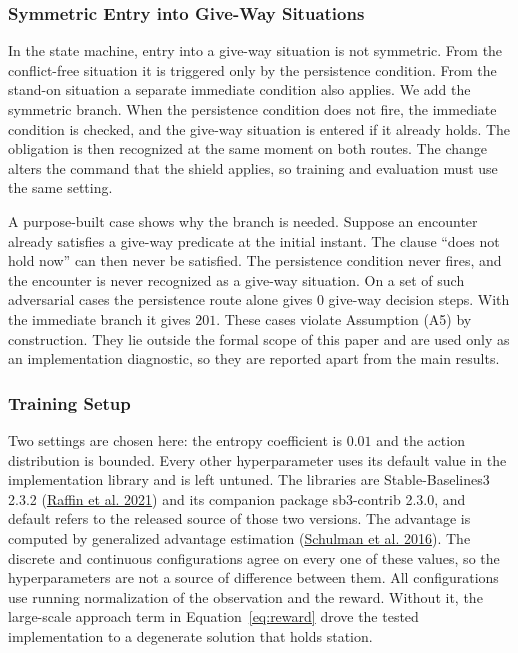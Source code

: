 \documentclass[10pt,letterpaper]{article}
\newcommand{\citl}[2]{(\hyperlink{ref:#1}{#2})}
\begin{document}
\subsubsection{Symmetric Entry into Give-Way Situations}
\label{sec:sym}

In the state machine, entry into a give-way situation is not symmetric. From the
conflict-free situation it is triggered only by the persistence condition. From the
stand-on situation a separate immediate condition also applies. We add the symmetric
branch. When the persistence condition
does not fire, the immediate condition is checked, and the give-way situation is entered if
it already holds. The obligation is then recognized at the same moment on both routes. The
change alters the command that the shield applies, so training and evaluation must use the
same setting.

A purpose-built case shows why the branch is needed. Suppose an encounter already satisfies
a give-way predicate at the initial instant. The clause ``does not hold now'' can then never
be satisfied. The persistence condition never fires, and the encounter is never recognized
as a give-way situation. On a set of such adversarial cases the persistence route alone
gives $0$ give-way decision steps. With the immediate branch it gives $201$. These cases violate Assumption (A5) by construction. They lie outside the formal scope
of this paper and are used only as an implementation diagnostic, so they are reported
apart from the main results.

\subsubsection{Training Setup}
\label{sec:train}

Two settings are chosen here: the entropy coefficient is $0.01$ and the action
distribution is bounded. Every other hyperparameter uses its default value in the
implementation library and is left untuned. The libraries are Stable-Baselines3 2.3.2 \citl{raffin2021}{Raffin et al. 2021}
and its companion package sb3-contrib 2.3.0, and default refers to the released source
of those two versions. The advantage is computed by generalized advantage estimation
\citl{schulman2016}{Schulman et al. 2016}. The discrete
and continuous configurations agree on every one of these values, so the hyperparameters are
not a source of difference between them. All configurations use running normalization of the observation and the reward. Without
it, the large-scale approach term in Equation~\eqref{eq:reward} drove the tested
implementation to a degenerate solution that holds station.
\end{document}
